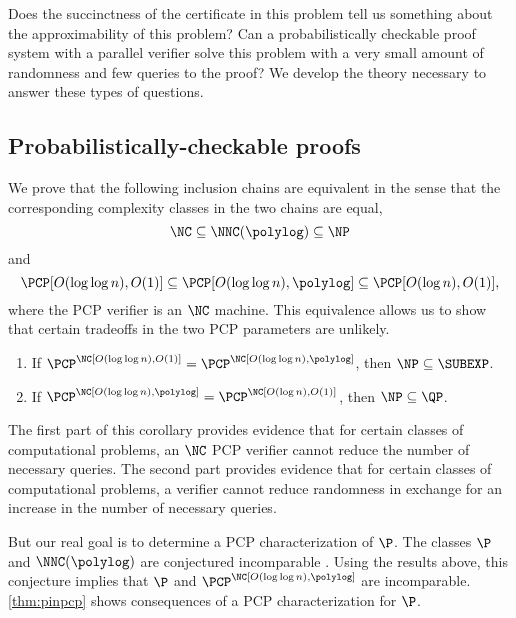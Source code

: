 \documentclass{article}
\begin{document}
Does the succinctness of the certificate in this problem tell us something about the approximability of this problem?
Can a probabilistically checkable proof system with a parallel verifier solve this problem with a very small amount of randomness and few queries to the proof?
We develop the theory necessary to answer these types of questions.

\subsection{Probabilistically-checkable proofs}
\label{sec:ncpcp}

We prove that the following inclusion chains are equivalent in the sense that the corresponding complexity classes in the two chains are equal,
\begin{equation*}
  \NC \subseteq \NNC(\polylog) \subseteq \NP
\end{equation*}
and
\begin{equation*}
  \PCP[O(\log \log n), O(1)] \subseteq \PCP[O(\log \log n), \polylog] \subseteq \PCP[O(\log n), O(1)],
\end{equation*}
where the PCP verifier is an $\NC$ machine.
This equivalence allows us to show that certain tradeoffs in the two PCP parameters are unlikely.
\begin{theorem}  %
  \mbox{}
  \begin{enumerate}
  \item If $\PCP^\NC[O(\log \log n), O(1)] = \PCP^\NC[O(\log \log n), \polylog]$, then $\NP \subseteq \SUBEXP$.
  \item If $\PCP^\NC[O(\log \log n), \polylog] = \PCP^\NC[O(\log n), O(1)]$, then $\NP \subseteq \QP$.
  \end{enumerate}
\end{theorem}

The first part of this corollary provides evidence that for certain classes of computational problems, an $\NC$ PCP verifier cannot reduce the number of necessary queries.
The second part provides evidence that for certain classes of computational problems, a verifier cannot reduce randomness in exchange for an increase in the number of necessary queries.

But our real goal is to determine a PCP characterization of $\P$.
The classes $\P$ and $\NNC(\polylog)$ are conjectured incomparable \autocite{wolf94}.
Using the results above, this conjecture implies that $\P$ and $\PCP^\NC[O(\log \log n), \polylog]$ are incomparable.
\autoref{thm:pinpcp} shows consequences of a PCP characterization for $\P$.
\end{document}
